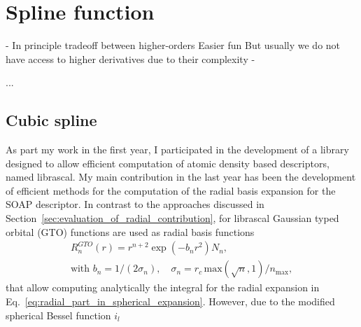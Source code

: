 \section{Spline function}
- In principle tradeoff between higher-orders Easier fun
  But usually we do not have access to higher derivatives due to their complexity
- 

...
\subsection{Cubic spline}
\label{sec:cubic_spline}
As part my work in the first year, I participated in the development of a library designed to allow efficient computation of atomic density based descriptors, named librascal.
My main contribution in the last year has been the development of efficient methods for the computation of the radial basis expansion for the SOAP descriptor.
In contrast to the approaches discussed in Section~\ref{sec:evaluation_of_radial_contribution}, for librascal Gaussian typed orbital (GTO) functions are used as radial basis functions 
\begin{subequations}
\begin{align}
R_n^{GTO}(r) = r^{n+2}\exp(-b_nr^2)N_n,\hspace{5em}\\
\text{with } b_n = 1/(2\sigma_n),\quad \sigma_n = r_c\,\textrm{max}(\sqrt{n},1)/n_{\text{max}},
\end{align}
\end{subequations}
that allow computing analytically the integral for the radial expansion in Eq.~\ref{eq:radial_part_in_spherical_expansion}. 
However, due to the modified spherical Bessel function $i_l$ %
